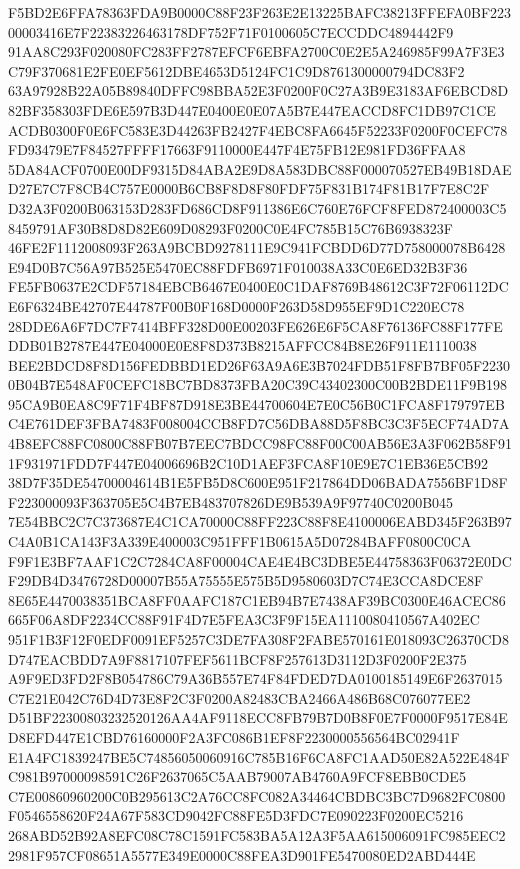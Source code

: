 \documentclass[UTF8,fontset=fandol,zihao=-4,a4paper]{ctexart}
\begin{document}
{{F5BD2E6FFA78363FDA9B0000C88F23F263E2E13225BAFC38213FFEFA0BF22300003416E7F22383226463178DF752F71F0100605C7ECCDDC4894442F9
91AA8C293F020080FC283FF2787EFCF6EBFA2700C0E2E5A246985F99A7F3E3C79F370681E2FE0EF5612DBE4653D5124FC1C9D8761300000794DC83F2
63A97928B22A05B89840DFFC98BBA52E3F0200F0C27A3B9E3183AF6EBCD8D82BF358303FDE6E597B3D447E0400E0E07A5B7E447EACCD8FC1DB97C1CE
ACDB0300F0E6FC583E3D44263FB2427F4EBC8FA6645F52233F0200F0CEFC78FD93479E7F84527FFFF17663F9110000E447F4E75FB12E981FD36FFAA8
5DA84ACF0700E00DF9315D84ABA2E9D8A583DBC88F000070527EB49B18DAED27E7C7F8CB4C757E0000B6CB8F8D8F80FDF75F831B174F81B17F7E8C2F
D32A3F0200B063153D283FD686CD8F911386E6C760E76FCF8FED872400003C58459791AF30B8D8D82E609D08293F0200C0E4FC785B15C76B6938323F
46FE2F1112008093F263A9BCBD9278111E9C941FCBDD6D77D758000078B6428E94D0B7C56A97B525E5470EC88FDFB6971F010038A33C0E6ED32B3F36
FE5FB0637E2CDF57184EBCB6467E0400E0C1DAF8769B48612C3F72F06112DCE6F6324BE42707E44787F00B0F168D0000F263D58D955EF9D1C220EC78
28DDE6A6F7DC7F7414BFF328D00E00203FE626E6F5CA8F76136FC88F177FEDDB01B2787E447E04000E0E8F8D373B8215AFFCC84B8E26F911E1110038
BEE2BDCD8F8D156FEDBBD1ED26F63A9A6E3B7024FDB51F8FB7BF05F22300B04B7E548AF0CEFC18BC7BD8373FBA20C39C43402300C00B2BDE11F9B198
95CA9B0EA8C9F71F4BF87D918E3BE44700604E7E0C56B0C1FCA8F179797EBC4E761DEF3FBA7483F008004CCB8FD7C56DBA88D5F8BC3C3F5ECF74AD7A
4B8EFC88FC0800C88FB07B7EEC7BDCC98FC88F00C00AB56E3A3F062B58F911F931971FDD7F447E04006696B2C10D1AEF3FCA8F10E9E7C1EB36E5CB92
38D7F35DE54700004614B1E5FB5D8C600E951F217864DD06BADA7556BF1D8FF223000093F363705E5C4B7EB483707826DE9B539A9F97740C0200B045
7E54BBC2C7C373687E4C1CA70000C88FF223C88F8E4100006EABD345F263B97C4A0B1CA143F3A339E400003C951FFF1B0615A5D07284BAFF0800C0CA
F9F1E3BF7AAF1C2C7284CA8F00004CAE4E4BC3DBE5E44758363F06372E0DCF29DB4D3476728D00007B55A75555E575B5D9580603D7C74E3CCA8DCE8F
8E65E4470038351BCA8FF0AAFC187C1EB94B7E7438AF39BC0300E46ACEC86665F06A8DF2234CC88F91F4D7E5FEA3C3F9F15EA1110080410567A402EC
951F1B3F12F0EDF0091EF5257C3DE7FA308F2FABE570161E018093C26370CD8D747EACBDD7A9F8817107FEF5611BCF8F257613D3112D3F0200F2E375
A9F9ED3FD2F8B054786C79A36B557E74F84FDED7DA0100185149E6F2637015C7E21E042C76D4D73E8F2C3F0200A82483CBA2466A486B68C076077EE2
D51BF22300803232520126AA4AF9118ECC8FB79B7D0B8F0E7F0000F9517E84ED8EFD447E1CBD76160000F2A3FC086B1EF8F2230000556564BC02941F
E1A4FC1839247BE5C74856050060916C785B16F6CA8FC1AAD50E82A522E484FC981B97000098591C26F2637065C5AAB79007AB4760A9FCF8EBB0CDE5
C7E00860960200C0B295613C2A76CC8FC082A34464CBDBC3BC7D9682FC0800F0546558620F24A67F583CD9042FC88FE5D3FDC7E090223F0200EC5216
268ABD52B92A8EFC08C78C1591FC583BA5A12A3F5AA615006091FC985EEC22981F957CF08651A5577E349E0000C88FEA3D901FE5470080ED2ABD444E
}}
\end{document}
